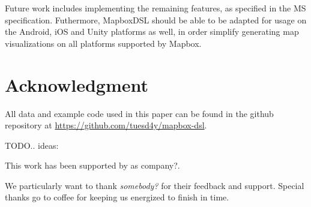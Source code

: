 \documentclass[conference]{IEEEtran}
\begin{document}
Future work includes implementing the remaining features, as specified in the MS specification. Futhermore, MapboxDSL should be able to be adapted for usage on the Android, iOS and Unity platforms as well, in order simplify generating map visualizations on all platforms supported by Mapbox.


\section*{Acknowledgment}

All data and example code used in this paper can be found in the github repository at  \href{https://github.com/tuesd4y/mapbox-dsl}{https://github.com/tuesd4y/mapbox-dsl}.

TODO.. ideas: 

This work has been supported by as company?.

We particularly want to thank \textit{somebody?} for their feedback and support. Special thanks go to coffee for keeping us energized to finish in time.

\end{document}
